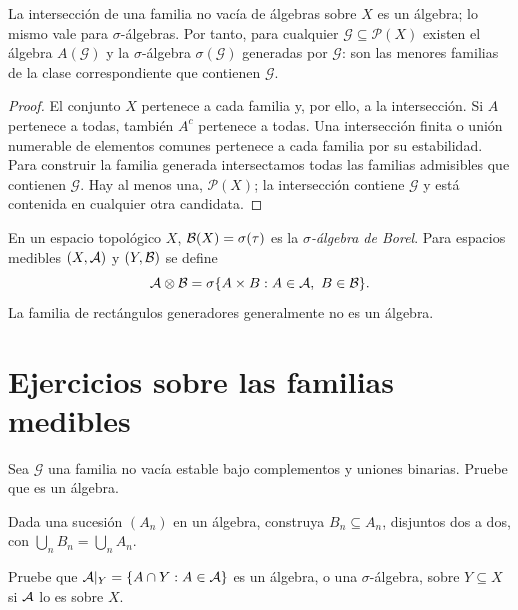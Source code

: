 \begin{proposicion}\label{prop:v2-generada}
La intersección de una familia no vacía de álgebras sobre $X$ es un álgebra; lo mismo vale para $\sigma$-álgebras. Por tanto, para cualquier $\mathcal G\subseteq\mathcal P(X)$ existen el álgebra $A(\mathcal G)$ y la $\sigma$-álgebra $\sigma(\mathcal G)$ generadas por $\mathcal G$: son las menores familias de la clase correspondiente que contienen $\mathcal G$.
\end{proposicion}
\begin{proof}
El conjunto $X$ pertenece a cada familia y, por ello, a la intersección. Si $A$ pertenece a todas, también $A^c$ pertenece a todas. Una intersección finita o unión numerable de elementos comunes pertenece a cada familia por su estabilidad. Para construir la familia generada intersectamos todas las familias admisibles que contienen $\mathcal G$. Hay al menos una, $\mathcal P(X)$; la intersección contiene $\mathcal G$ y está contenida en cualquier otra candidata.
\end{proof}
\begin{definicion}
En un espacio topológico $X$, $\mathcal B(X)=\sigma(\tau)$ es la \emph{$\sigma$-álgebra de Borel}. Para espacios medibles $(X,\mathcal A)$ y $(Y,\mathcal B)$ se define
\[\Acal\otimes\Bcal=\sigma\{A\times B:A\in\Acal,\ B\in\Bcal\}.\]
La familia de rectángulos generadores generalmente no es un álgebra.
\end{definicion}

\section{Ejercicios sobre las familias medibles}
\begin{ejercicio}\label{ej:v2-l01-1}
Sea $\mathcal G$ una familia no vacía estable bajo complementos y uniones binarias. Pruebe que es un álgebra.
\end{ejercicio}

\begin{ejercicio}\label{ej:v2-l01-2}
Dada una sucesión $(A_n)$ en un álgebra, construya $B_n\subseteq A_n$, disjuntos dos a dos, con $\bigcup_nB_n=\bigcup_nA_n$.
\end{ejercicio}

\begin{ejercicio}\label{ej:v2-l01-3}
Pruebe que $\mathcal A|_Y=\{A\cap Y:A\in\mathcal A\}$ es un álgebra, o una $\sigma$-álgebra, sobre $Y\subseteq X$ si $\mathcal A$ lo es sobre $X$.
\end{ejercicio}

